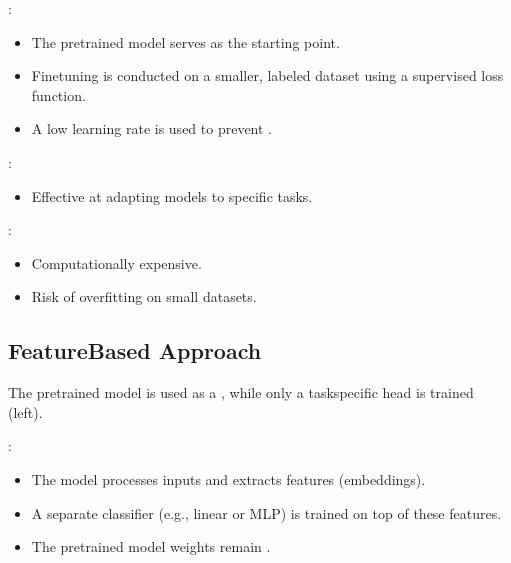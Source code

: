 \documentclass[letterpaper,11pt,english]{sphinxmanual}
\begin{document}
\sphinxAtStartPar
{}:
\begin{itemize}
\item {} 
\sphinxAtStartPar
The pre\sphinxhyphen{}trained model serves as the starting point.

\item {} 
\sphinxAtStartPar
Fine\sphinxhyphen{}tuning is conducted on a smaller, labeled dataset using a supervised loss function.

\item {} 
\sphinxAtStartPar
A low learning rate is used to prevent .

\end{itemize}

\sphinxAtStartPar
{}:
\begin{itemize}
\item {} 
\sphinxAtStartPar
Effective at adapting models to specific tasks.

\end{itemize}

\sphinxAtStartPar
{}:
\begin{itemize}
\item {} 
\sphinxAtStartPar
Computationally expensive.

\item {} 
\sphinxAtStartPar
Risk of overfitting on small datasets.

\end{itemize}


\subsection{Feature\sphinxhyphen{}Based Approach}
\label{\detokenize{finetuning:feature-based-approach}}
\sphinxAtStartPar
The pre\sphinxhyphen{}trained model is used as a , while only a task\sphinxhyphen{}specific head is trained {\hyperref[\detokenize{finetuning:fig-fine-tuning}]{}} (left).

\sphinxAtStartPar
{}:
\begin{itemize}
\item {} 
\sphinxAtStartPar
The model processes inputs and extracts features (embeddings).

\item {} 
\sphinxAtStartPar
A separate classifier (e.g., linear or MLP) is trained on top of these features.

\item {} 
\sphinxAtStartPar
The pre\sphinxhyphen{}trained model weights remain .

\end{itemize}
\end{document}
